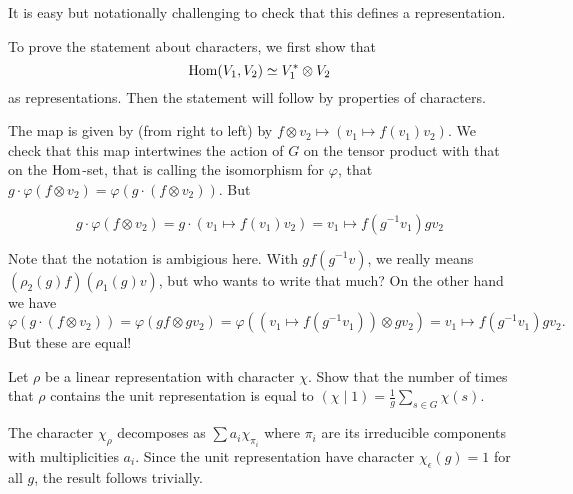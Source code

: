 \documentclass[11pt, english]{article}
\begin{document}
\begin{sol}
  It is easy but notationally challenging to check that this defines a representation.

To prove the statement about characters, we first show that
$$
\operatorname{Hom}(V_1, V_2) \simeq V_1^\ast \otimes V_2
$$
as representations. Then the statement will follow by properties of characters.

The map is given by (from right to left) by $f \otimes v_2 \mapsto (v_1 \mapsto f(v_1)v_2)$. We check that this map intertwines the action of $G$ on the tensor product with that on the $\operatorname{Hom}$-set, that is calling the isomorphism for $\varphi$, that $g \cdot \varphi(f \otimes v_2) = \varphi ( g \cdot (f \otimes v_2))$. But

$$
g \cdot \varphi( f \otimes v_2) = g \cdot (v_1 \mapsto f(v_1)v_2) = v_1 \mapsto f(g^{-1}v_1) g v_2
$$

Note that the notation is ambigious here. With $gf(g^{-1}v)$, we really means $(\rho_2(g)f)(\rho_1(g)v)$, but who wants to write that much? On the other hand we have
$$
\varphi ( g \cdot (f \otimes v_2)) = \varphi ( gf \otimes gv_2) = \varphi((v_1 \mapsto f(g^{-1}v_1)) \otimes gv_2) = v_1 \mapsto f(g^{-1}v_1)  g v_2.
$$
But these are equal!
\end{sol}

\begin{exc}[Exercise 2.5]
Let $\rho$ be a linear representation with character $\chi$. Show that the number of times that $\rho$ contains the unit representation is equal to $(\chi \mid 1)=\frac 1g \sum_{s \in G} \chi(s)$.  
\end{exc}

\begin{sol}
The character $\chi_\rho$ decomposes as $\sum a_i \chi_{\pi_i}$ where $\pi_i$ are its irreducible components with multiplicities $a_i$. Since the unit representation have character $\chi_\epsilon(g)=1$ for all $g$, the result follows trivially.
\end{sol}
\end{document}
